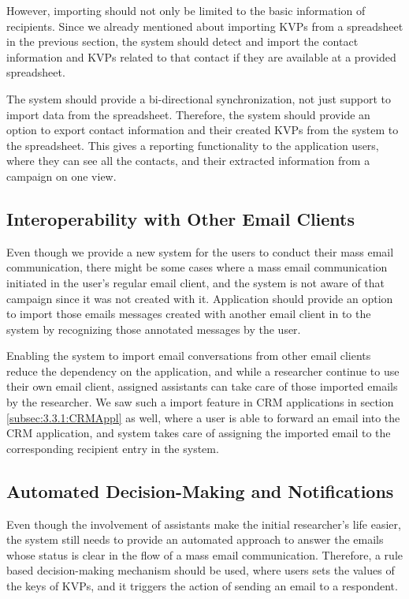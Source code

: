 However, importing should not only be limited to the basic information of recipients. Since we already mentioned about importing \ac{KVP}s from a spreadsheet in the previous section, the system should detect and import the contact information and \ac{KVP}s related to that contact if they are available at a provided spreadsheet. 
\vspace{1cm}

The system should provide a bi-directional synchronization, not just support to import data from the spreadsheet. Therefore, the system should provide an option to export contact information and their created \ac{KVP}s from the system to the spreadsheet. This gives a reporting functionality to the application users, where they can see all the contacts, and their extracted information from a campaign on one view.

\subsection{Interoperability with Other Email Clients}
\label{subsec:5.1.4:InteEmaiClie}
Even though we provide a new system for the users to conduct their mass email communication, there might be some cases where a mass email communication initiated in the user's regular email client, and the system is not aware of that campaign since it was not created with it. Application should provide an option to import those emails messages created with another email client in to the system by recognizing those annotated messages by the user.
\vspace{1cm}

Enabling the system to import email conversations from other email clients reduce the dependency on the application, and while a researcher continue to use their own email client, assigned assistants can take care of those imported emails by the researcher. We saw such a import feature in \ac{CRM} applications in section \ref{subsec:3.3.1:CRMAppl} as well, where a user is able to forward an email into the \ac{CRM} application, and system takes care of assigning the imported email to the corresponding recipient entry in the system.

\subsection{Automated Decision-Making and Notifications}
\label{subsec:5.1.5:AutoDeciMakiNoti}
Even though the involvement of assistants make the initial researcher's life easier, the system still needs to provide an automated approach to answer the emails whose status is clear in the flow of a mass email communication. Therefore, a rule based decision-making mechanism should be used, where users sets the values of the keys of \ac{KVP}s, and it triggers the action of sending an email to a respondent.
\vspace{1cm}

